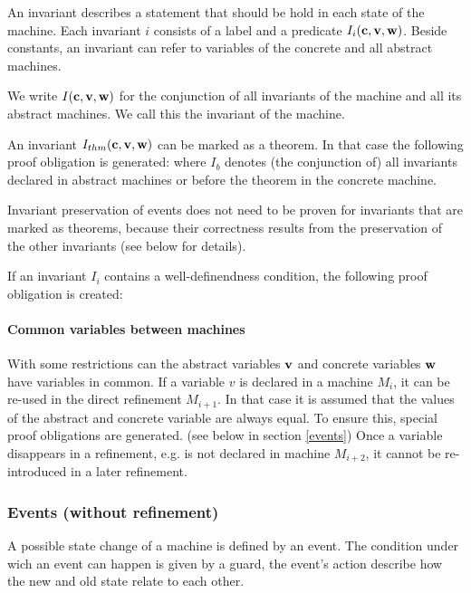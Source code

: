 An invariant describes a statement that should be hold in each state of the machine.
Each invariant $i$ consists of a label and a predicate $I_i(\textbf{c},\textbf{v},\textbf{w})$.
Beside constants, an invariant can refer to variables of the concrete and all abstract machines.

We write $I(\textbf{c},\textbf{v},\textbf{w})$ for the conjunction of all invariants
of the machine and all its abstract machines. We call this the invariant of the machine.

An invariant $I_{thm}(\textbf{c},\textbf{v},\textbf{w})$ can be marked as a theorem. In that case the following proof obligation is generated:
where $I_b$ denotes (the conjunction of) all invariants declared in abstract machines or before
the theorem in the concrete machine.

Invariant preservation of events does not need to be proven for invariants that are marked as theorems, because
 their correctness results from the preservation of the other invariants (see below for details).

If an invariant $I_i$ contains a well-definendness condition, the following proof obligation is created:

\paragraph{Common variables between machines}
With some restrictions can the abstract variables $\textbf{v}$ and concrete
  variables $\textbf{w}$ have variables in common.
If a variable $v$ is declared in a machine $M_i$, it can be re-used in the
  direct refinement $M_{i+1}$. 
In that case it is assumed that the values of the abstract and concrete variable 
  are always equal.
To ensure this, special proof obligations are generated. (see below in section \ref{events})
Once a variable disappears in a refinement, e.g. is not declared in machine $M_{i+2}$,
  it cannot be re-introduced in a later refinement.

\subsubsection{Events (without refinement)}
\label{events_no_refinement}
A possible state change of a machine is defined by an event.
The condition under wich an event can happen is given by a guard, the event's action
describe how the new and old state relate to each other.

